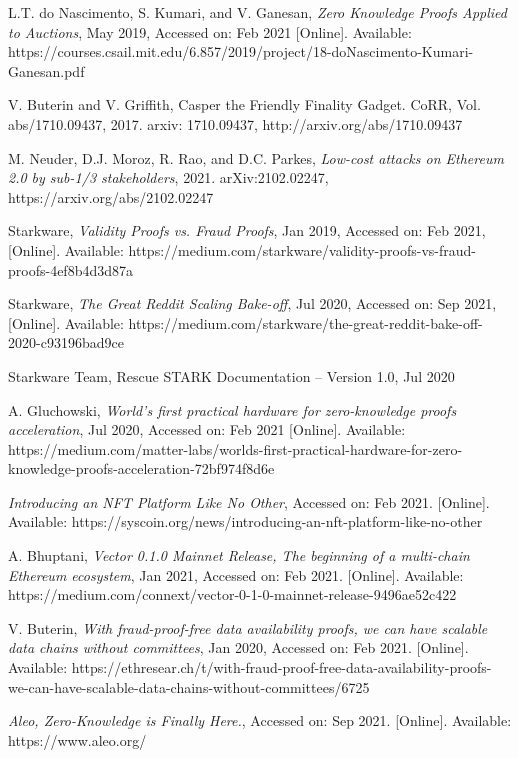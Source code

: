 \documentclass[peerreview]{ieeesyscoin}
\begin{document}
\begin{thebibliography}{00}
 L.T. do Nascimento, S. Kumari, and V. Ganesan, \textit{Zero Knowledge Proofs Applied to Auctions}, May 2019, Accessed on: Feb 2021 [Online].   Available: https://courses.csail.mit.edu/6.857/2019/project/18-doNascimento-Kumari-Ganesan.pdf

 V. Buterin and V. Griffith, Casper the Friendly Finality Gadget. CoRR, Vol. abs/1710.09437, 2017. arxiv: 1710.09437, http://arxiv.org/abs/1710.09437

 M. Neuder, D.J. Moroz, R. Rao, and D.C. Parkes, \textit{Low-cost attacks on Ethereum 2.0 by sub-1/3 stakeholders}, 2021. arXiv:2102.02247,  https://arxiv.org/abs/2102.02247

 Starkware, \textit{Validity Proofs vs. Fraud Proofs}, Jan 2019, Accessed on: Feb 2021, [Online]. Available: https://medium.com/starkware/validity-proofs-vs-fraud-proofs-4ef8b4d3d87a

 Starkware, \textit{The Great Reddit Scaling Bake-off}, Jul 2020, Accessed on: Sep 2021, [Online]. Available: https://medium.com/starkware/the-great-reddit-bake-off-2020-c93196bad9ce

  Starkware Team, Rescue STARK Documentation – Version 1.0, Jul 2020

 A. Gluchowski, \textit{World’s first practical hardware for zero-knowledge proofs acceleration}, Jul 2020, Accessed on: Feb 2021 [Online]. Available:  https://medium.com/matter-labs/worlds-first-practical-hardware-for-zero-knowledge-proofs-acceleration-72bf974f8d6e

  \textit{Introducing an NFT Platform Like No Other}, Accessed on: Feb 2021. [Online]. Available: https://syscoin.org/news/introducing-an-nft-platform-like-no-other

 A. Bhuptani, \textit{Vector 0.1.0 Mainnet Release, The beginning of a multi-chain Ethereum ecosystem}, Jan 2021, Accessed on: Feb 2021.  [Online]. Available:  https://medium.com/connext/vector-0-1-0-mainnet-release-9496ae52c422

  V. Buterin, \textit{With fraud-proof-free data availability proofs, we can have scalable data chains without committees}, Jan 2020, Accessed on: Feb 2021.  [Online]. Available:  https://ethresear.ch/t/with-fraud-proof-free-data-availability-proofs-we-can-have-scalable-data-chains-without-committees/6725

  \textit{Aleo, Zero-Knowledge is Finally Here.}, Accessed on: Sep 2021. [Online]. Available: https://www.aleo.org/


\end{thebibliography}
\end{document}

